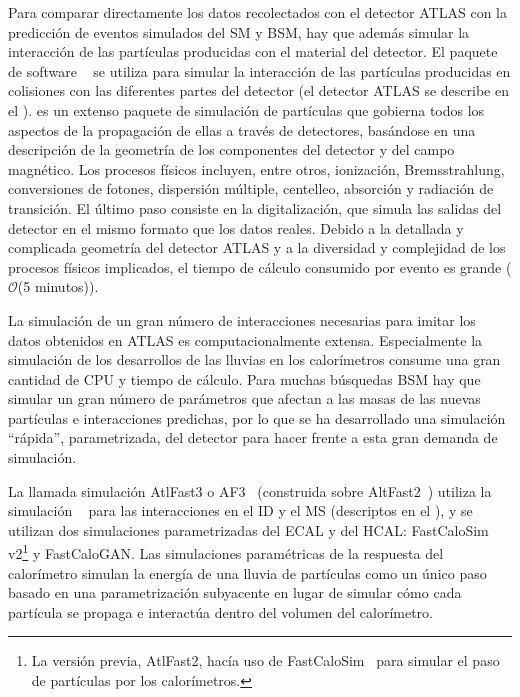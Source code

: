 Para comparar directamente los datos recolectados con el detector \ac{ATLAS} con la predicción de eventos simulados del \ac{SM} y \ac{BSM}, hay que además simular la interacción de las partículas producidas con el material del detector.
El paquete de software \GEANT~\cite{Geant4} se utiliza para simular la interacción de las partículas producidas en colisiones \pp  con las diferentes partes del detector (el detector \ac{ATLAS} se describe en el \Ch{\ref{ch:atlas}}). \GEANT es un extenso paquete de simulación de partículas que gobierna todos los aspectos de la propagación de ellas a través de detectores, basándose en una descripción de la geometría de los componentes del detector y del campo magnético. Los procesos físicos incluyen, entre otros, ionización, Bremsstrahlung, conversiones de fotones, dispersión múltiple, centelleo, absorción y radiación de transición. El último paso consiste en la digitalización, que simula las salidas del detector en el mismo formato que los datos reales. Debido a la detallada y complicada geometría del detector \ac{ATLAS} y a la diversidad y complejidad de los procesos físicos implicados, el tiempo de cálculo consumido por evento es grande (\(\mathcal{O}\)(5 minutos)).

La simulación de un gran número de interacciones necesarias para imitar los datos obtenidos en \ac{ATLAS} es computacionalmente extensa. Especialmente la simulación de los desarrollos de las lluvias en los calorímetros consume una gran cantidad de CPU y tiempo de cálculo. Para muchas búsquedas \ac{BSM} hay que simular un gran número de parámetros que afectan a las masas de las nuevas partículas e interacciones predichas, por lo que se ha desarrollado una simulación \enquote{rápida}, parametrizada, del detector para hacer frente a esta gran demanda de simulación.

La llamada simulación AtlFast3 o AF3~\cite{ATLAS-AF3} (construida sobre AltFast2~\cite{ATLAS-AF2}) utiliza la simulación \GEANT~\cite{Geant4} para las interacciones en el \ac{ID} y el \ac{MS} (descriptos en el \Ch{\ref{ch:atlas}}), y se utilizan dos simulaciones parametrizadas del \ac{ECAL} y del \ac{HCAL}: FastCaloSim v2\footnote{La versión previa, AtlFast2, hacía uso de FastCaloSim~\cite{ATLAS-FastCaloSim} para simular el paso de partículas por los calorímetros.} y FastCaloGAN.
Las simulaciones paramétricas de la respuesta del calorímetro simulan la energía de una lluvia de partículas como un único paso basado en una parametrización subyacente en lugar de simular cómo cada partícula se propaga e interactúa dentro del volumen del calorímetro.

